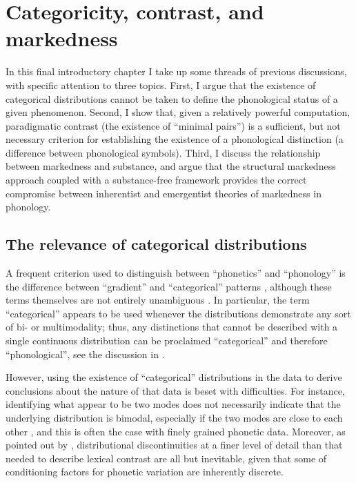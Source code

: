 \chapter{Categoricity, contrast, and markedness}
\label{cha:categ-contr-mark}

In this final introductory chapter I take up some threads of previous discussions, with specific attention to three topics. First, I argue that the existence of categorical distributions cannot be taken to define the phonological status of a given phenomenon. Second, I show that, given a relatively powerful computation, paradigmatic contrast (\ie the existence of \enquote{minimal pairs}) is a sufficient, but not necessary criterion for establishing the existence of a phonological distinction (\ie a difference between phonological symbols). Third, I discuss the relationship between markedness and substance, and argue that the structural markedness approach coupled with a substance\hyp free framework provides the correct compromise between inherentist and emergentist theories of markedness in phonology.

\section{The relevance of categorical distributions}
\label{sec:relev-categ-distr}

A frequent criterion used to distinguish between \enquote{phonetics} and \enquote{phonology} is the difference between \enquote{gradient} and \enquote{categorical} patterns \citep[\egm][]{myers-phonoknowledge}, although these terms themselves are not entirely unambiguous \citep{cohn06:_is,scobbie07:_inter}. In particular, the term \enquote{categorical} appears to be used whenever the distributions demonstrate any sort of bi- or multimodality; thus, any distinctions that cannot be described with a single continuous distribution can be proclaimed \enquote{categorical} and therefore \enquote{phonological}, see \eg the discussion in \citet{tucker10:_what}.

However, using the existence of \enquote{categorical} distributions in the data to derive conclusions about the nature of that data is beset with difficulties. For instance, identifying what appear to be two modes does not necessarily indicate that the underlying distribution is bimodal, especially if the two modes are close to each other \citep{schilling02:_is_human_heigh_bimod}, and this is often the case with finely grained phonetic data. Moreover, as pointed out by \citet[§1.5]{scobbie07:_inter}, distributional discontinuities at a finer level of detail than that needed to describe lexical contrast are all but inevitable, given that some of conditioning factors for phonetic variation are inherently discrete.

